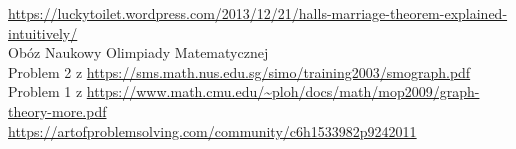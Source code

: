 
 \url{https://luckytoilet.wordpress.com/2013/12/21/halls-marriage-theorem-explained-intuitively/} \\
 Obóz Naukowy Olimpiady Matematycznej \\
 Problem 2 z \url{https://sms.math.nus.edu.sg/simo/training2003/smograph.pdf} \\
 Problem 1 z \url{https://www.math.cmu.edu/~ploh/docs/math/mop2009/graph-theory-more.pdf} \\
 \url{https://artofproblemsolving.com/community/c6h1533982p9242011} \\

